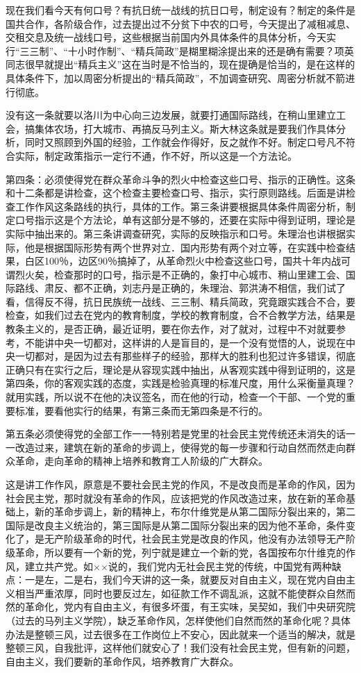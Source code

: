 现在我们看今天有何口号？有抗日统一战线的抗日口号，制定设有？制定的条件是国共合作，各阶级合作，过去提出过不分贫下中农的口号，今天提出了减租减息、交租交息及统一战线口号，这些根据当前国内外具体条件的具体分析，今天实行“三三制”、“十小时作制”、“精兵简政”是糊里糊涂提出来的还是确有需要？项英同志很早就提出“精兵主义”这在当时是不恰当的，现在提确是恰当的，是在这样的具体条件下，加以周密分析提出的“精兵简政”，不加调查研究、周密分析就不箭进行彻底。

没有这一条就要以洛川为中心向三边发展，就要打通国际路线，在稍山里建立工会，搞集体农场，打大城市、再搞反马列主义。斯大林这条就是要我们作具体分析，同时又照顾到外国的经验，工作就会作得好，反之就作不好。制定口号凡不符合实际，制定政策指示一定行不通，作不好，所以这是一个方法论。

第四条：必须使得党在群众革命斗争的烈火中检查这些口号、指示的正确性。这条和十二条都是讲检查，这个检查主要检查口号、指示，实行原则路线。后面是讲检查工作作风这条路线的执行，具体的工作。第三条讲要根据具体条件周密分析，制定口号指示这是个方法论，单有这部分是不够的，还要在实际中得到证明，理论是实际中抽出来的。第三条讲调查研究，实际的反映指示和口号。朱理治也讲根据实际，他是根据国际形势有两个世界对立．国内形势有两个对立等，在实践中检查结果，白区100％，边区90％搞掉了，从革命烈火中检查这些口号，国共十年内战可谓烈火矣，检查那时的口号，指示是不正确的，象打中心城市、稍山里建工会、国际路线、肃反、都不正确，刘志丹是正确的，朱理治、郭洪涛不相信，我们试了看，信得反不得，抗日民族统一战线、三三制、精兵简政，究竟跟实践合不合，要检查，如我们过去在党内的教育制度，学校的教育制度，合不合教学方法，结果是教条主义的，是否正确，最近证明，要在你去作，对了就对，过程中不对就要参考，不能讲中央一切都对，这样讲的人是盲目的，是一个没有觉悟的人，说现在中央一切都对，是因为过去有那些样子的经验，那样大的胜利也犯过许多错误，彻底正确只有在实行之后，理论是从容现实践中抽出，从客观实践中得到证明的，这是第四条，你的客观实践的态度，实践是检验真理的标准尺度，用什么采衡量真理？就用实践，所以说不在他的决议签名，而在他的行动，检查一个干部、一个党的重要标准，要看他实行的结果，有第三条而无第四条是不行的。

第五条必须使得党的全部工作一一特别若是党里的社会民主党传统还未消失的话一一改造过来，建筑在新的革命的步调上，使得党的每一步骤和行动自然而然走向群众革命，走向革命的精神上培养和教育工人阶级的广大群众。

这是讲工作作风，原意是不要社会民主党的作风，不是改良而是革命的作风，因为社会民主党，那时就没有革命的作风，应该把党的作风改造过来，放在新的革命基础上，新的革命步调上，新的精神上，布尔什维党是从第二国际分裂出来的，第二国际是改良主义统治的，第三国际是从第二国际分裂出来的因为他不革命，条件变化了，是无产阶级革命的时代，社会民主党是改良的作风，他没有办法领导无产阶级革命，所以要有一个新的党，列宁就是建立一个新的党，各国按布尔什维克的作风，建立共产党。如××说的，我们党内无社会民主党的传统，中国党有两种缺点：一是左，二是右，我们今天讲的这一条，就要反对自由主义，现在党内自由主义相当严重浓厚，同时也要反过左，如征款工作不调乱派，这就不能使群众自然而然的革命化，党内有自由主义，有很多坏蛋，有王实味，吴契如，我们中央研究院（过去的马列主义学院），缺乏革命作风，怎样使他们自然而然的革命化呢？具体办法是整顿三风，过去很多在工作岗位上不安心，因此就来一个适当的解决，就是整顿三风，自我批评，这样他们就安心了！我们没有社会民主党，但有新的问题，自由主义，我们要新的革命作风，培养教育广大群众。

